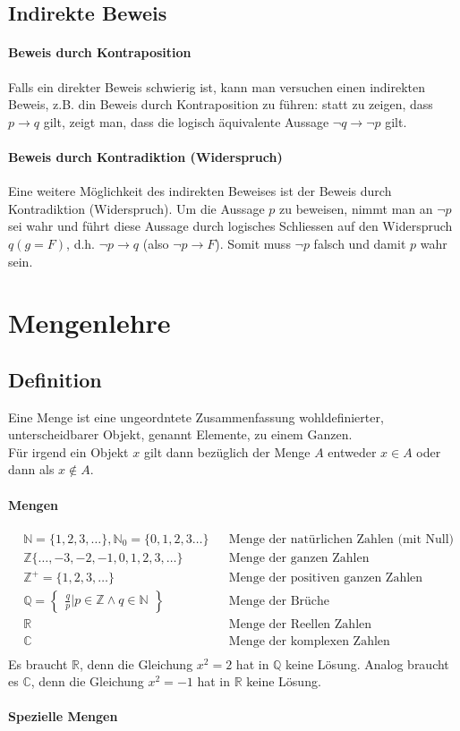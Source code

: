 \documentclass[12pt,a4paper]{article}
\begin{document}
\subsection{Indirekte Beweis}
\paragraph{Beweis durch Kontraposition}Falls ein direkter Beweis schwierig ist, kann man versuchen einen indirekten Beweis, z.B. din Beweis durch Kontraposition zu führen: statt zu zeigen, dass $p \rightarrow q$ gilt, zeigt man, dass die logisch äquivalente Aussage $\neg q \rightarrow \neg p$ gilt.
\paragraph{Beweis durch Kontradiktion (Widerspruch)}Eine weitere Möglichkeit des indirekten Beweises ist der Beweis durch Kontradiktion (Widerspruch). Um die Aussage $p$ zu beweisen, nimmt man an $\neg p$ sei wahr und führt diese Aussage durch logisches Schliessen auf den Widerspruch $q (g=F)$, d.h. $\neg p \rightarrow q$ (also $\neg p \rightarrow F$). Somit muss $\neg p$ falsch und damit $p$ wahr sein.

\section{Mengenlehre}
\subsection{Definition}
Eine Menge ist eine ungeordntete Zusammenfassung wohldefinierter, unterscheidbarer Objekt, genannt Elemente, zu einem Ganzen.\\
Für irgend ein Objekt $x$ gilt dann bezüglich der Menge $A$ entweder $x\in A$ oder dann als $x\notin A$.
\paragraph{Mengen}
\begin{align*}
&\mathbb{N}=\{1, 2, 3, \dots\}, \mathbb{N}_0=\{0, 1, 2, 3 \dots\} &&\text{Menge der natürlichen Zahlen (mit Null)}\\
&\mathbb{Z}\{\dots,-3,-2,-1,0,1,2,3,\dots\} &&\text{Menge der ganzen Zahlen}\\
&\mathbb{Z}^+=\{1,2,3,\dots\} &&\text{Menge der positiven ganzen Zahlen}\\
&\mathbb{Q}=\begin{Bmatrix} \frac{q}{p}\bigg|p\in \mathbb{Z}\wedge q\in \mathbb{N} \end{Bmatrix} &&\text{Menge der Brüche}\\
&\mathbb{R} &&\text{Menge der Reellen Zahlen}\\
&\mathbb{C} &&\text{Menge der komplexen Zahlen}\\
\end{align*}
Es braucht $\mathbb{R}$, denn die Gleichung $x^2=2$ hat in $\mathbb{Q}$ keine Lösung. Analog braucht es $\mathbb{C}$, denn die Gleichung $x^2=-1$ hat in $\mathbb{R}$ keine Lösung.

\paragraph{Spezielle Mengen}
\end{document}
